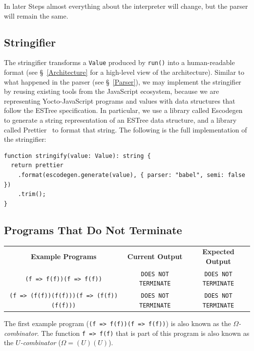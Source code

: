 \documentclass[12pt, oneside]{book}
\begin{document}
In later Steps almost everything about the interpreter will change, but the parser will remain the same.

\subsection{Stringifier}
\label{Step 0: Stringifier}

The stringifier transforms a \texttt{Value} produced by \texttt{run()} into a human-readable format (see §~\ref{Architecture} for a high-level view of the architecture). Similar to what happened in the parser (see §~\ref{Parser}), we may implement the stringifier by reusing existing tools from the JavaScript ecosystem, because we are representing Yocto-JavaScript programs and values with data structures that follow the ESTree specification. In particular, we use a library called Escodegen~\cite{escodegen} to generate a string representation of an ESTree data structure, and a library called Prettier~\cite{prettier} to format that string. The following is the full implementation of the stringifier:

\begin{verbatim}
function stringify(value: Value): string {
  return prettier
    .format(escodegen.generate(value), { parser: "babel", semi: false })
    .trim();
}
\end{verbatim}

\subsection{Programs That Do Not Terminate}
\label{Programs That Do Not Terminate}

\begin{center}
\begin{tabular}{c|c|c}
\textbf{Example Programs} & \textbf{Current Output} & \textbf{Expected Output} \\
\texttt{(f => f(f))(f => f(f))} & \texttt{DOES NOT TERMINATE} & \texttt{DOES NOT TERMINATE} \\
\texttt{(f => (f(f))(f(f)))(f => (f(f))(f(f)))} & \texttt{DOES NOT TERMINATE} & \texttt{DOES NOT TERMINATE} \\
\end{tabular}
\end{center}

\begin{mdframed}[frametitle = {Technical Terms}]
The first example program (\texttt{(f => f(f))(f => f(f))}) is also known as the \emph{$\Omega$-combinator}. The function \texttt{f => f(f)} that is part of this program is also known as the \emph{$U$-combinator} ($\Omega = (U)(U)$).
\end{mdframed}
\end{document}
